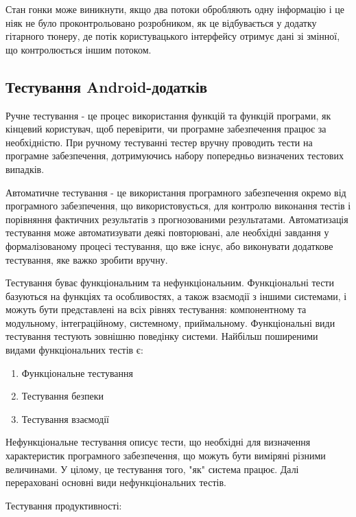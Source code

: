 Стан гонки може виникнути, якщо два потоки обробляють одну інформацію і це ніяк не було проконтрольовано розробником, як це відбувається у додатку гітарного тюнеру, де потік користувацького інтерфейсу отримує дані зі змінної, що контролюється іншим потоком.

\subsection{Тестування Android-додатків}

Ручне тестування - це процес використання функцій та функцій програми, як кінцевий користувач, щоб перевірити, чи програмне забезпечення працює за необхідністю. При ручному тестуванні тестер вручну проводить тести на програмне забезпечення, дотримуючись набору попередньо визначених тестових випадків.

Автоматичне тестування - це використання програмного забезпечення окремо від програмного забезпечення, що використовується, для контролю виконання тестів і порівняння фактичних результатів з прогнозованими результатами. Автоматизація тестування може автоматизувати деякі повторювані, але необхідні завдання у формалізованому процесі тестування, що вже існує, або виконувати додаткове тестування, яке важко зробити вручну. \cite{huizinga2007automated}

Тестування буває функціональним та нефункціональним.
Функціональні тести базуються на функціях та особливостях, а також взаємодії з іншими системами, і можуть бути представлені на всіх рівнях тестування: компонентному та модульному, інтеграційному, системному, приймальному. Функціональні види тестування тестують зовнішню поведінку системи. Найбільш поширеними видами функціональних тестів є:

\begin{enumerate}
\item Функціональне тестування
\item Тестування безпеки
\item Тестування взаємодії
\end{enumerate}

Нефункціональне тестування описує тести, що необхідні для визначення характеристик програмного забезпечення, що можуть бути виміряні різними величинами. У цілому, це тестування того, "як" система працює. Далі перераховані основні види нефункціональних тестів.

Тестування продуктивності:

